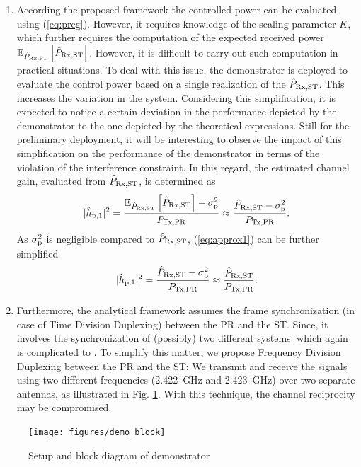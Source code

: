 \begin{enumerate}
	\item According the proposed framework the controlled power can be evaluated using (\ref{eq:preg}). However, it requires knowledge of the scaling parameter $K$, which further requires the computation of the expected received power ${\mathbb E}_{\hat{P}_{\text{Rx,ST}}}\left[ \hat{P}_{\text{Rx,ST}} \right]$. However, it is difficult to carry out such computation in practical situations. To deal with this issue, the demonstrator is deployed to evaluate the control power based on a single realization of the $\hat{P}_{\text{Rx,ST}}$. This increases the variation in the system. Considering this simplification, it is expected to notice a certain deviation in the performance depicted by the demonstrator to the one depicted by the theoretical expressions. Still for the preliminary deployment, it will be interesting to observe the impact of this simplification on the performance of the demonstrator in terms of the violation of the interference constraint. In this regard, the estimated channel gain, evaluated from $\hat{P}_{\text{Rx,ST}}$, is determined as 
	\begin{equation}
		|\hat{h}_{\text{p,1}}|^2 = \frac{{\mathbb E}_{\hat{P}_{\text{Rx,ST}}}\left[ \hat{P}_{\text{Rx,ST}} \right]-\sigma^2_{\text{p}}}{P_{\text{Tx,PR}}} \approx \frac{\hat{P}_{\text{Rx,ST}}-\sigma^2_{\text{p}}}{P_{\text{Tx,PR}}}. 
		\label{eq:approx1}
	\end{equation}	
As $\sigma^2_{\text{p}}$ is negligible compared to $\hat{P}_{\text{Rx,ST}}$, (\ref{eq:approx1}) can be further simplified
	\begin{equation}
		|\hat{h}_{\text{p,1}}|^2 = \frac{\hat{P}_{\text{Rx,ST}}-\sigma^2_{\text{p}}}{P_{\text{Tx,PR}}} \approx \frac{\hat{P}_{\text{Rx,ST}}}{P_{\text{Tx,PR}}}.
		\label{eq:approx2}
	\end{equation}	
	\item Furthermore, the analytical framework assumes the frame synchronization (in case of Time Division Duplexing) between the PR and the ST. Since, it involves the synchronization of (possibly) two different systems.  which again is complicated to . To simplify this matter, we propose Frequency Division Duplexing between the PR and the ST: We transmit and receive the signals using two different frequencies (\SI{2.422}{GHz} and \SI{2.423}{GHz}) over two separate antennas, as illustrated in Fig. \ref{demo_blockA}. With this technique, the channel reciprocity may be compromised.	
\end{enumerate}

\begin{figure}
	\centering
	\texttt{[image: figures/demo\_block]}
	\caption{Setup and block diagram of demonstrator}
	\label{demo_blockA}
\end{figure}

